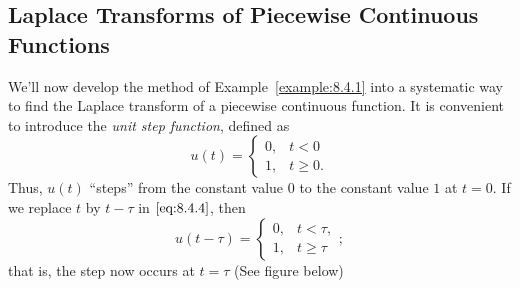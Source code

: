 \documentclass{ximera}
\begin{document}
\subsection*{Laplace Transforms of Piecewise Continuous Functions}

We'll now develop the method of Example~\ref{example:8.4.1} into a
systematic way to find the Laplace transform of a piecewise continuous
function. It is convenient to introduce the \textit{unit step
function}, defined as
\begin{equation}\label{eq:8.4.4}
u(t)=\left\{\begin{array}{rl}
0,&t<0\\
1,&t\geq 0.
\end{array}\right.
\end{equation}
Thus, $u(t)$ ``steps'' from the constant value $0$ to the constant
value $1$ at $t=0$. If we replace $t$ by
$t-\tau$ in $\eqref{eq:8.4.4}$, then
$$
u(t-\tau)=\left\{\begin{array}{rl}
0,&t<\tau,\\
1,&t\geq \tau
\end{array}\right.;
$$
that is, the step now occurs at $t=\tau$ (See figure below) %

\begin{center}
\end{center}

\end{document}
